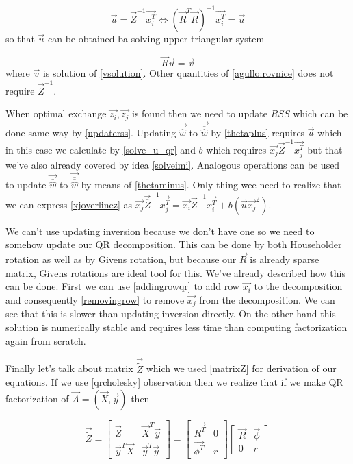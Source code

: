 \begin{equation}
	\vec{u} = \vec{Z}^{-1}\vec{x_i^T} 	\iff (\vec{R}^T\vec{R})^{-1}\vec{x_i^T} = \vec{u}
\end{equation}
so that $\vec{u}$ can be obtained ba solving upper triangular system 

\begin{equation} \label{solve_u_qr}
	\vec{R}\vec{u} = \vec{v}
\end{equation}
where $\vec{v}$ is solution of \ref{vsolution}. Other quantities of \ref{agullo:rovnice} does not require $\vec{Z}^{-1}$.

When optimal exchange $\vec{z_i}, \vec{z_j}$ is found then we need to update $RSS$ which can be done same way by \ref{updaterss}. Updating $\vec{\hat{w}}$ to  $\vec{\overline{\hat{w}}}$ by \ref{thetaplus} requires
$\vec{u}$  which in this case we calculate by \ref{solve_u_qr} and $b$ which requires  $\vec{x_j}\vec{Z}^{-1}\vec{x_j^T}$ but that we've also already covered by idea \ref{solveimi}. Analogous operations can be used to update $\vec{\overline{\hat{w}}}$ to $\vec{\overline{\overline{\hat{w}}}}$  by means of \ref{thetaminus}. Only thing wee need to realize that we can express \ref{xjoverlinez} as $\vec{x_j}\vec{\overline{{Z}}}^{-1}\vec{x_j^T} = \vec{x_i}\vec{{{Z}}}^{-1}\vec{x_i^T} + b(\vec{u}\vec{x_j}^2)$.

We can't use updating inversion because we don't have one so we need to somehow update our QR decomposition. This can be done by both Householder rotation as well as by Givens rotation, but because our $\vec{R}$ is already sparse matrix, Givens rotations are ideal tool for this. We've already described how this can be done. First we can use \ref{addingrowqr} to add row $\vec{x_i}$ to the decomposition and consequently \ref{removingrow} to remove $\vec{x_j}$  from the decomposition. We can see that this is slower than updating inversion directly. On the other hand this solution is numerically stable and requires less time than computing factorization again from scratch. 

Finally let's talk about matrix $\vec{\tilde{Z}}$ which we used \ref{matrixZ} for derivation of our equations. If we use \ref{qrcholesky} observation then we realize that if we make QR factorization of $\vec{A} = (\vec{X}, \vec{y})$ then

\begin{equation}
	\vec{\tilde{Z}} = 
	\begin{bmatrix}
		\vec{Z} & \vec{X}^T\vec{y} \\
    \vec{y}^T\vec{X} & \vec{y}^T\vec{y}
	\end{bmatrix} 
	= 
	\begin{bmatrix}
		\vec{R^T} & 0 \\
    \vec{\phi^T} & r
	\end{bmatrix} 
	\begin{bmatrix} 
		\vec{R} & \vec{\phi} \\
     0 & r
	\end{bmatrix} 
\end{equation}

